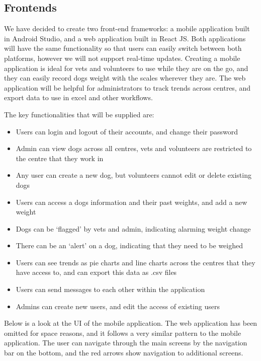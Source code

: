 \subsection{Frontends}
We have decided to create two front-end frameworks: a mobile application built in Android Studio, and a web application built in React JS. Both applications will have the same functionality so that users can easily switch between both platforms, however we will not support real-time updates. Creating a mobile application is ideal for vets and volunteers to use while they are on the go, and they can easily record dogs weight with the scales wherever they are. The web application will be helpful for administrators to track trends across centres, and export data to use in excel and other workflows. 

The key functionalities that will be supplied are:
\begin{itemize}
  \item Users can login and logout of their accounts, and change their password
  \item Admin can view dogs across all centres, vets and volunteers are restricted to the centre that they work in
  \item Any user can create a new dog, but volunteers cannot edit or delete existing dogs
  \item Users can access a dogs information and their past weights, and add a new weight
  \item Dogs can be ‘flagged’ by vets and admin, indicating alarming weight change
  \item There can be an ‘alert’ on a dog, indicating that they need to be weighed
  \item Users can see trends as pie charts and line charts across the centres that they have access to, and can export this data as .csv files
  \item Users can send messages to each other within the application
  \item Admins can create new users, and edit the access of existing users
 \end{itemize}
 
 Below is a look at the UI of the mobile application. The web application has been omitted for space reasons, and it follows a very similar pattern to the mobile application. The user can navigate through the main screens by the navigation bar on the bottom, and the red arrows show navigation to additional screens. 
 

